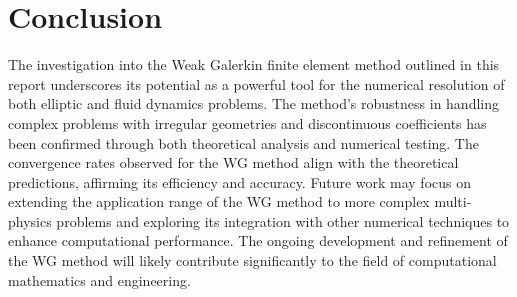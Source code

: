 \documentclass[12pt]{article} %
\begin{document}
\section{Conclusion}
The investigation into the Weak Galerkin finite element method outlined in this report underscores its potential as a powerful tool for the numerical resolution of both elliptic and fluid dynamics problems. The method's robustness in handling complex problems with irregular geometries and discontinuous coefficients has been confirmed through both theoretical analysis and numerical testing. The convergence rates observed for the WG method align with the theoretical predictions, affirming its efficiency and accuracy. Future work may focus on extending the application range of the WG method to more complex multi-physics problems and exploring its integration with other numerical techniques to enhance computational performance. The ongoing development and refinement of the WG method will likely contribute significantly to the field of computational mathematics and engineering.
\end{document}
